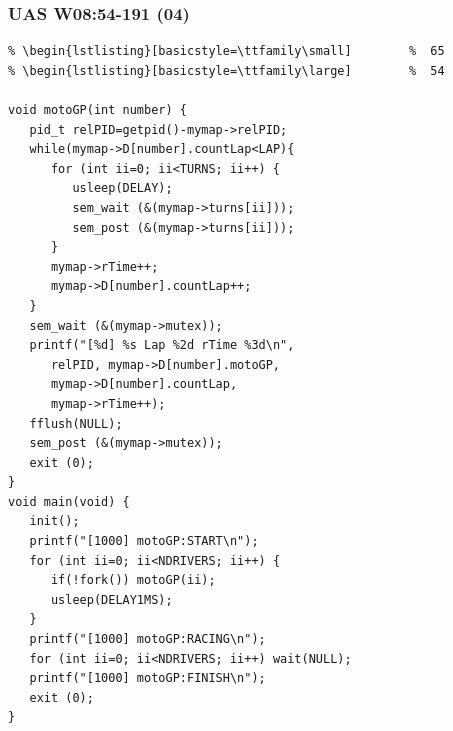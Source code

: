 \documentclass[xcolor=table, notheorems, hyperref={pdfpagelabels=false}]{beamer}
\begin{document}
\begin{frame}[fragile]
\frametitle{UAS W08:54-191 (04)}
\begin{lstlisting}[basicstyle=\ttfamily\tiny]         % 108
% \begin{lstlisting}[basicstyle=\ttfamily\footnotesize] %  72
% \begin{lstlisting}[basicstyle=\ttfamily\small]        %  65
% \begin{lstlisting}[basicstyle=\ttfamily\large]        %  54

void motoGP(int number) {
   pid_t relPID=getpid()-mymap->relPID;
   while(mymap->D[number].countLap<LAP){
      for (int ii=0; ii<TURNS; ii++) {
         usleep(DELAY);
         sem_wait (&(mymap->turns[ii]));
         sem_post (&(mymap->turns[ii]));
      }
      mymap->rTime++;
      mymap->D[number].countLap++;
   }
   sem_wait (&(mymap->mutex));
   printf("[%d] %s Lap %2d rTime %3d\n",
      relPID, mymap->D[number].motoGP,
      mymap->D[number].countLap,
      mymap->rTime++);
   fflush(NULL);
   sem_post (&(mymap->mutex));
   exit (0);
}
void main(void) {
   init();
   printf("[1000] motoGP:START\n");
   for (int ii=0; ii<NDRIVERS; ii++) {
      if(!fork()) motoGP(ii); 
      usleep(DELAY1MS);
   }
   printf("[1000] motoGP:RACING\n");
   for (int ii=0; ii<NDRIVERS; ii++) wait(NULL);
   printf("[1000] motoGP:FINISH\n");
   exit (0);
}

\end{lstlisting}
\end{frame}
\end{document}
